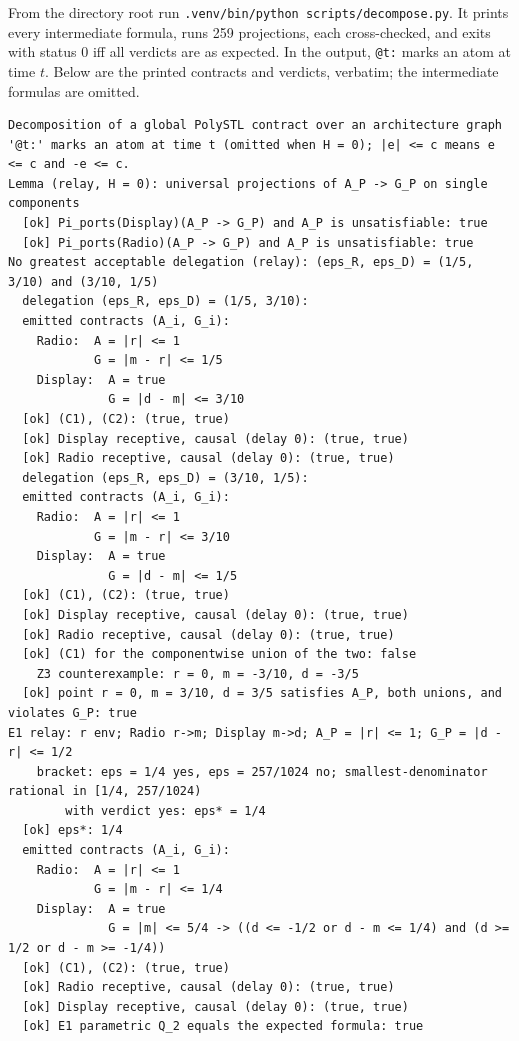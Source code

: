 \documentclass[11pt]{article}
\makeatletter
\renewcommand\section{\@startsection{section}{1}{\z@}{-2.2ex plus -.5ex minus -.2ex}{1.1ex plus .2ex}{\normalfont\large\bfseries}}
\theoremstyle{definition}
\theoremstyle{remark}
\makeatother
\begin{document}
\section{Reproduction}\label{sec:repro}
From the directory root run \texttt{.venv/bin/python scripts/decompose.py}. It prints every intermediate formula, runs 259 projections, each cross-checked, and exits with status 0 iff all verdicts are as expected.
In the output, \texttt{@t:} marks an atom at time $t$. Below are the printed contracts and verdicts, verbatim; the intermediate formulas are omitted.
{\fontsize{7}{8}\selectfont
\begin{verbatim}
Decomposition of a global PolySTL contract over an architecture graph
'@t:' marks an atom at time t (omitted when H = 0); |e| <= c means e <= c and -e <= c.
Lemma (relay, H = 0): universal projections of A_P -> G_P on single components
  [ok] Pi_ports(Display)(A_P -> G_P) and A_P is unsatisfiable: true
  [ok] Pi_ports(Radio)(A_P -> G_P) and A_P is unsatisfiable: true
No greatest acceptable delegation (relay): (eps_R, eps_D) = (1/5, 3/10) and (3/10, 1/5)
  delegation (eps_R, eps_D) = (1/5, 3/10):
  emitted contracts (A_i, G_i):
    Radio:  A = |r| <= 1
            G = |m - r| <= 1/5
    Display:  A = true
              G = |d - m| <= 3/10
  [ok] (C1), (C2): (true, true)
  [ok] Display receptive, causal (delay 0): (true, true)
  [ok] Radio receptive, causal (delay 0): (true, true)
  delegation (eps_R, eps_D) = (3/10, 1/5):
  emitted contracts (A_i, G_i):
    Radio:  A = |r| <= 1
            G = |m - r| <= 3/10
    Display:  A = true
              G = |d - m| <= 1/5
  [ok] (C1), (C2): (true, true)
  [ok] Display receptive, causal (delay 0): (true, true)
  [ok] Radio receptive, causal (delay 0): (true, true)
  [ok] (C1) for the componentwise union of the two: false
    Z3 counterexample: r = 0, m = -3/10, d = -3/5
  [ok] point r = 0, m = 3/10, d = 3/5 satisfies A_P, both unions, and violates G_P: true
E1 relay: r env; Radio r->m; Display m->d; A_P = |r| <= 1; G_P = |d - r| <= 1/2
    bracket: eps = 1/4 yes, eps = 257/1024 no; smallest-denominator rational in [1/4, 257/1024)
        with verdict yes: eps* = 1/4
  [ok] eps*: 1/4
  emitted contracts (A_i, G_i):
    Radio:  A = |r| <= 1
            G = |m - r| <= 1/4
    Display:  A = true
              G = |m| <= 5/4 -> ((d <= -1/2 or d - m <= 1/4) and (d >= 1/2 or d - m >= -1/4))
  [ok] (C1), (C2): (true, true)
  [ok] Radio receptive, causal (delay 0): (true, true)
  [ok] Display receptive, causal (delay 0): (true, true)
  [ok] E1 parametric Q_2 equals the expected formula: true

\end{verbatim}}
\end{document}
